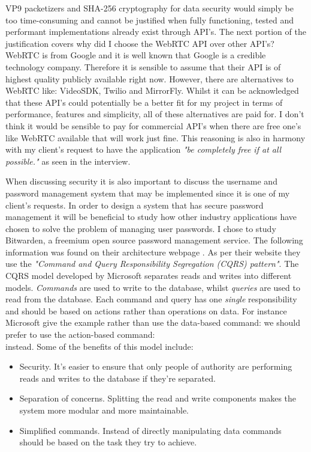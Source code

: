 VP9 packetizers \cite{vp9} and SHA-256 cryptography for data
security would simply be too time-consuming and cannot be
justified when fully functioning, tested and performant
implementations already exist through API's. The next
portion of the justification covers why did I choose the
WebRTC API over other API's? WebRTC is from Google and it is
well known that Google is a credible technology company.
Therefore it is sensible to assume that their API is of
highest quality publicly available right now. However, there
are alternatives to WebRTC like: VideoSDK, Twilio and
MirrorFly. Whilst it can be acknowledged that these API's could
potentially be a better fit for my project in terms of
performance, features and simplicity, all of these alternatives
are paid for. I don't think it would be sensible to pay for
commercial API's when there are free one's like WebRTC
available that will work just fine. This reasoning is also in
harmony with my client's request to have the application
\textit{"be completely free if at all possible."} as seen in
the interview. \\ \vspace{0.2cm}

When discussing security it is also important to discuss the
username and password management system that may be implemented
since it is one of my client's requests. In order to design a
system that has secure password management it will be
beneficial to study how other industry applications have chosen
to solve the problem of managing user passwords. I chose to
study Bitwarden, a freemium open source password management
service. The following information was found on their
architecture webpage \cite{Bitwarden}. As per their website
they use the \textit{"Command and Query Responsibility
Segregation (CQRS) pattern"}. The CQRS model developed by
Microsoft separates reads and writes into different models.
\textit{Commands} are used to write to the database, whilst
\textit{queries} are used to read from the database. Each
command and query has one \emph{single} responsibility and
should be based on actions rather than operations on data. For
instance Microsoft give the example rather than use the
data-based command: 
we should prefer to use the action-based command: \\
 instead. Some of the benefits of
this model include:

\begin{itemize}
  \item Security. It's easier to ensure that only people of authority are performing reads and writes to the database if
they're separated.

  \item Separation of concerns. Splitting the read and write components makes the system more modular and more maintainable.

  \item Simplified commands. Instead of directly manipulating data commands should be based on the task they try to
achieve.
\end{itemize}

